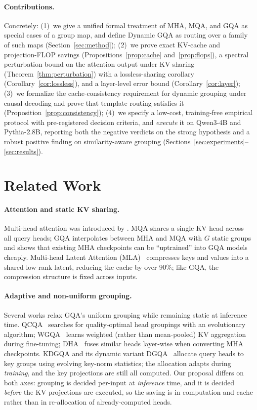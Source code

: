 \documentclass{article}
\begin{document}
\paragraph{Contributions.}
Concretely:
(1)~we give a unified formal treatment of MHA, MQA, and GQA as special cases
of a group map, and define Dynamic GQA as routing over a family of such maps
(Section~\ref{sec:method});
(2)~we prove exact KV-cache and projection-FLOP savings
(Propositions~\ref{prop:cache} and~\ref{prop:flops}), a spectral perturbation
bound on the attention output under KV sharing
(Theorem~\ref{thm:perturbation}) with a lossless-sharing corollary
(Corollary~\ref{cor:lossless}), and a layer-level error bound
(Corollary~\ref{cor:layer});
(3)~we formalize the cache-consistency requirement for dynamic grouping under
causal decoding and prove that template routing satisfies it
(Proposition~\ref{prop:consistency});
(4)~we specify a low-cost, training-free empirical protocol with
pre-registered decision criteria, and \emph{execute} it on Qwen3-4B and
Pythia-2.8B, reporting both the negative verdicts on the strong hypothesis
and a robust positive finding on similarity-aware grouping
(Sections~\ref{sec:experiments}--\ref{sec:results}).

\section{Related Work}
\label{sec:related}

\paragraph{Attention and static KV sharing.}
Multi-head attention was introduced by \citet{vaswani2017attention}. MQA
\citep{shazeer2019fast} shares a single KV head across all query heads; GQA
\citep{ainslie2023gqa} interpolates between MHA and MQA with $G$ static
groups and shows that existing MHA checkpoints can be ``uptrained'' into GQA
models cheaply. Multi-head Latent Attention (MLA)~\citep{deepseek2024v2}
compresses keys and values into a shared low-rank latent, reducing the cache
by over 90\%; like GQA, the compression structure is fixed across inputs.

\paragraph{Adaptive and non-uniform grouping.}
Several works relax GQA's uniform grouping while remaining static at
inference time. QCQA~\citep{joshi2024qcqa} searches for quality-optimal head
groupings with an evolutionary algorithm; WGQA~\citep{chinnakonduru2024wgqa}
learns weighted (rather than mean-pooled) KV aggregation during fine-tuning;
DHA~\citep{chen2024dha} fuses similar heads layer-wise when converting MHA
checkpoints. KDGQA and its dynamic variant DGQA~\citep{khan2024beyond}
allocate query heads to key groups using evolving key-norm statistics; the
allocation adapts during \emph{training}, and the key projections are still
all computed. Our proposal differs on both axes: grouping is decided
per-input at \emph{inference} time, and it is decided \emph{before} the KV
projections are executed, so the saving is in computation and cache rather
than in re-allocation of already-computed heads.
\end{document}
